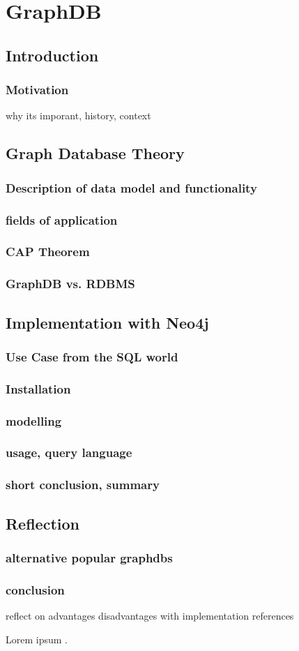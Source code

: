 \chapter{GraphDB}

\section{Introduction}
\subsection{Motivation}
why its imporant, history, context

\section{Graph Database Theory}
\subsection{Description of data model and functionality}
\subsection{fields of application}
\subsection{CAP Theorem}
\subsection{GraphDB vs. RDBMS}

\section{Implementation with Neo4j}
\subsection{Use Case from the SQL world}
\subsection{Installation}
\subsection{modelling}
\subsection{usage, query language}
\subsection{short conclusion, summary}

\section{Reflection}
\subsection{alternative popular graphdbs}
\subsection{conclusion}
reflect on advantages disadvantages with implementation references

Lorem ipsum \parencite[cf.][42]{musterfrau2019}.
